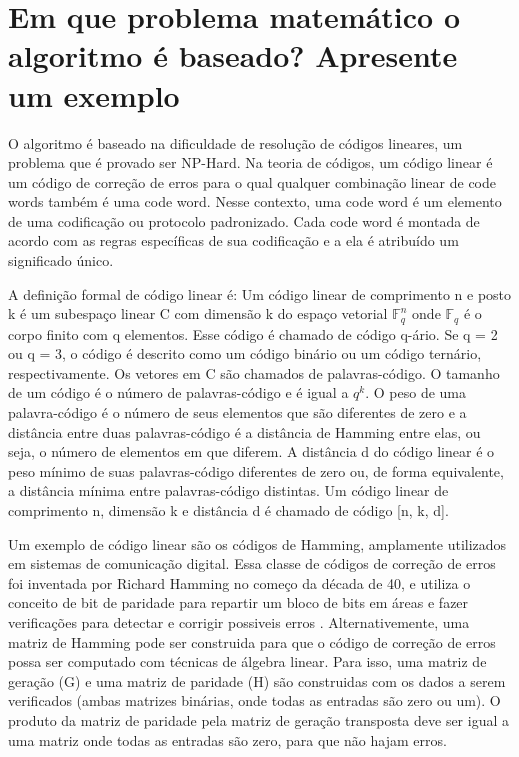 \section*{Em que problema matemático o algoritmo é baseado? Apresente um exemplo}

O algoritmo é baseado na dificuldade de resolução de códigos lineares, um problema que é provado ser NP-Hard. Na teoria de códigos, um código linear é um código de correção de erros para o qual qualquer combinação linear de code words também é uma code word. Nesse contexto, uma code word é um elemento de uma codificação ou protocolo padronizado. Cada code word é montada de acordo com as regras específicas de sua codificação e a ela é atribuído um significado único.

A definição formal de código linear é: Um código linear de comprimento n e posto k é um subespaço linear C com dimensão k do espaço vetorial $\mathds{F}_q^n$ onde $\mathds{F}_q$ é o corpo finito com q elementos. Esse código é chamado de código q-ário. Se q = 2 ou q = 3, o código é descrito como um código binário ou um código ternário, respectivamente. Os vetores em C são chamados de palavras-código. O tamanho de um código é o número de palavras-código e é igual a $q^k$. O peso de uma palavra-código é o número de seus elementos que são diferentes de zero e a distância entre duas palavras-código é a distância de Hamming entre elas, ou seja, o número de elementos em que diferem. A distância d do código linear é o peso mínimo de suas palavras-código diferentes de zero ou, de forma equivalente, a distância mínima entre palavras-código distintas. Um código linear de comprimento n, dimensão k e distância d é chamado de código [n, k, d].

Um exemplo de código linear são os códigos de Hamming, amplamente utilizados em sistemas de comunicação digital. Essa classe de códigos de correção de erros foi inventada por Richard Hamming no começo da década de 40, e utiliza o conceito de bit de paridade para repartir um bloco de bits em áreas e fazer verificações para detectar e corrigir possiveis erros \cite{HammingVideo}. Alternativemente, uma matriz de Hamming pode ser construida para que o código de correção de erros possa ser computado com técnicas de álgebra linear. Para isso, uma matriz de geração (G) e uma matriz de paridade (H) são construidas com os dados a serem verificados (ambas matrizes binárias, onde todas as entradas são zero ou um). O produto da matriz de paridade pela matriz de geração transposta deve ser igual a uma matriz onde todas as entradas são zero, para que não hajam erros.

